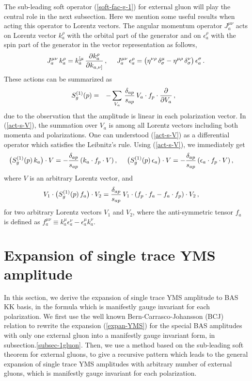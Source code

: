 \documentclass[11pt,a4paper]{article}
\newcommand{\bea}{\begin{eqnarray}}
\newcommand{\eea}{\end{eqnarray}}
\def\eref#1{(\ref{#1})}
\begin{document}
The sub-leading soft operator \eref{soft-fac-g-1} for external gluon will play the central role in the next subsection. Here we mention some useful results when acting this operator to Lorentz vectors. The angular momentum operator $J_a^{\mu\nu}$ acts on Lorentz vector $k^\rho_a$ with the orbital part of the generator and on $\epsilon^\rho_a$ with the spin part of the generator in the vector representation as follows,
%
\bea
J_a^{\mu\nu}\,k_a^\rho=k_a^{[\mu}\,{\partial k_a^\rho\over\partial k_{a,\nu]}}\,,~~~~
J_a^{\mu\nu}\,\epsilon_a^\rho=\big(\eta^{\nu\rho}\,\delta^\mu_\sigma-\eta^{\mu\rho}\,\delta^\nu_\sigma\big)\,\epsilon^\sigma_a\,.
\eea
%
These actions can be summarized as
%
\bea
S^{(1)}_g(p)&=&-\sum_{V_a}\,{\delta_{ap}\over s_{ap}}\,V_a\cdot f_p\cdot{\partial\over\partial V_a}\,,~~\label{act-s-V}
\eea
%
due to the observation that the amplitude is linear in each polarization vector. In \eref{act-s-V}, the summation over $V_a$
is among all Lorentz vectors including both momenta and polarizations. One can understood \eref{act-s-V} as a differential operator which satisfies the Leibnitz's rule. Using \eref{act-s-V}, we immediately get
%
\bea
\big(S^{(1)}_g(p)\,k_a\big)\cdot V=-{\delta_{ap}\over s_{ap}}\,(k_a\cdot f_p\cdot V)\,,~~~~\big(S^{(1)}_g(p)\,\epsilon_a\big)\cdot V=-{\delta_{ap}\over s_{ap}}\,(\epsilon_a\cdot f_p\cdot V)\,,~~~~\label{iden-1}
\eea
%
where $V$ is an arbitrary Lorentz vector, and
%
\bea
V_1\cdot\big(S^{(1)}_g(p)\,f_a\big)\cdot V_2={\delta_{ap}\over s_{ap}}\,V_1\cdot(f_p\cdot f_a-f_a\cdot f_p)\cdot V_2\,,~~~~\label{iden-2}
\eea
%
for two arbitrary Lorentz vectors $V_1$ and $V_2$, where the anti-symmetric tensor $f_a$ is defined as $f_a^{\mu\nu}\equiv k_a^\mu\epsilon_a^\nu-\epsilon_a^\mu k_a^\nu$.

\section{Expansion of single trace YMS amplitude}
\label{sec-expan-YMS}

In this section, we derive the expansion of single trace YMS amplitude to BAS KK basis, in the formula which is manifestly gauge invariant for each polarization. We first use the well known Bern-Carrasco-Johansson (BCJ) relation to rewrite the expansion \eref{expan-YMS} for the special BAS amplitudes with only one external gluon into a manifestly gauge invariant form, in subsection.\ref{subsec-1gluon}. Then, we use a method based on the sub-leading soft theorem for external gluons, to give a recursive pattern which leads to the general expansion of single trace YMS amplitudes with arbitrary number of external gluons,
which is manifestly gauge invariant for each polarization.
\end{document}
